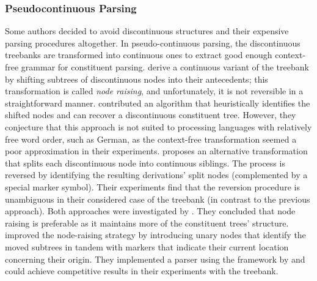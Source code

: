 \documentclass[../document.tex]{subfiles}
\begin{document}
    \subsubsection*{Pseudocontinuous Parsing}
    Some authors decided to avoid discontinuous structures and their expensive parsing procedures altogether.
    In pseudo-continuous parsing, the discontinuous treebanks are transformed into continuous ones to extract good enough context-free grammar for constituent parsing.
     derive a continuous variant of the \negra{} treebank by shifting subtrees of discontinuous nodes into their antecedents; this transformation is called \emph{node raising}, and unfortunately, it is not reversible in a straightforward manner.
     contributed an algorithm that heuristically identifies the shifted nodes and can recover a discontinuous constituent tree.
    However, they conjecture that this approach is not suited to processing languages with relatively free word order, such as German, as the context-free transformation seemed a poor approximation in their experiments.
     proposes an alternative transformation that splits each discontinuous node into continuous siblings.
    The process is reversed by identifying the resulting derivations' split nodes (complemented by a special marker symbol).
    Their experiments find that the reversion procedure is unambiguous in their considered case of the \tiger{} treebank (in contrast to the previous approach).
    Both approaches were investigated by \citet{hsu2010comparing}.
    They concluded that node raising is preferable as it maintains more of the constituent trees' structure.
     improved the node-raising strategy by introducing unary nodes that identify the moved subtrees in tandem with markers that indicate their current location concerning their origin.
    They implemented a parser using the  framework by \citet{Petrov06} and could achieve competitive results in their experiments with the \tiger{} treebank.

\end{document}

